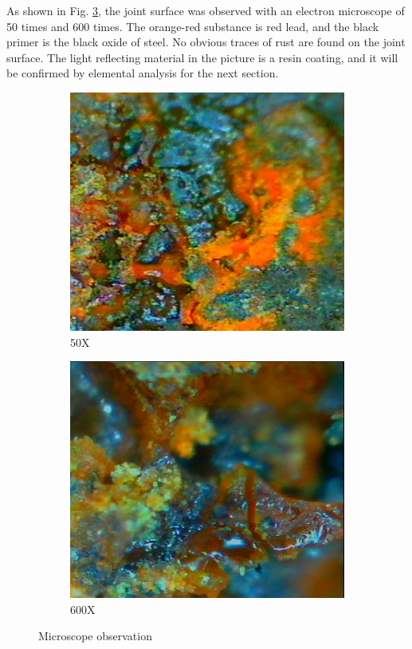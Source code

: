 As shown in Fig. \ref{ch3fig3}, the joint surface was observed with an electron microscope of 50 times and 600 times. The orange-red substance is red lead, and the black primer is the black oxide of steel. No obvious traces of rust are found on the joint surface. The light reflecting material in the picture is a resin coating, and it will be confirmed by elemental analysis for the next section.

\begin{figure}
    \centering
    \begin{subfigure}[t]{0.4\textwidth}
    \includegraphics[width=\linewidth]{imgs/ch3/fig3a.jpeg}
    \caption{50X}
    \label{ch3fig3a}  
    \end{subfigure}
    \hfill
    \begin{subfigure}[t]{0.4\textwidth}
    \includegraphics[width=\linewidth]{imgs/ch3/fig3b.jpeg}
    \caption{600X}
    \label{ch3fig3b}  
    \end{subfigure}
    \caption{Microscope observation}
    \label{ch3fig3}
\end{figure}

